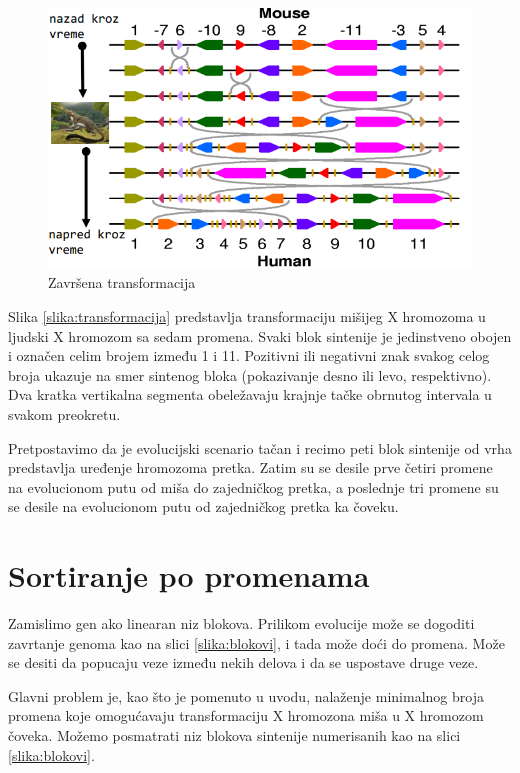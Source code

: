 \begin{figure}[h!]
\centering
\includegraphics[scale=0.32]{poglavlja/6/slike/niz7.png}
\caption{Završena transformacija}
\end{figure}
\fi 

Slika \ref{slika:transformacija} predstavlja transformaciju mišijeg X hromozoma u ljudski X hromozom sa sedam promena. Svaki blok sintenije je jedinstveno obojen i označen celim brojem između 1 i 11. Pozitivni ili negativni znak svakog celog broja ukazuje na smer sintenog bloka (pokazivanje desno ili levo, respektivno). Dva kratka vertikalna segmenta obeležavaju krajnje tačke obrnutog intervala u svakom preokretu.

Pretpostavimo da je evolucijski scenario tačan i recimo peti blok sintenije od vrha predstavlja uređenje hromozoma pretka. Zatim su se desile prve četiri promene na evolucionom putu od miša do zajedničkog pretka, a poslednje tri promene su se desile na evolucionom putu od zajedničkog pretka ka čoveku.


\section{Sortiranje po promenama}

Zamislimo gen ako linearan niz blokova. Prilikom evolucije može se dogoditi zavrtanje genoma kao na slici \ref{slika:blokovi}, i tada može doći do promena. Može se desiti da popucaju veze između nekih delova i da se uspostave druge veze. 


Glavni problem je, kao što je pomenuto u uvodu, nalaženje minimalnog broja promena koje omogućavaju transformaciju X hromozona miša u X hromozom čoveka. Možemo posmatrati niz blokova sintenije numerisanih kao na slici \ref{slika:blokovi}.


